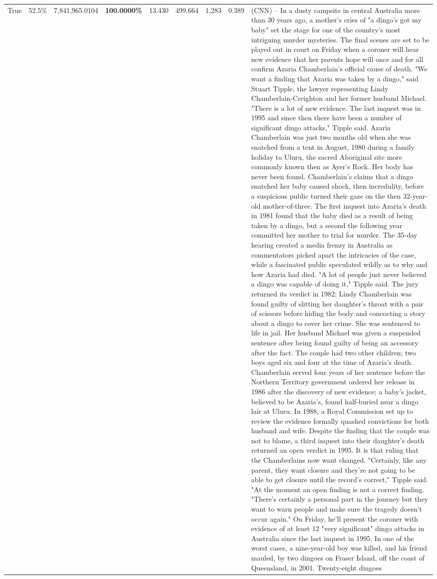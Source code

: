 \begin{table}[H]
\begin{tabular}{lllrlllll}
True & 52.5\% & 7,841,965.0104 & \bfseries \color{red} 100.0000\% & 13.430 & 499.664 & 1,283 & 0.389 & (CNN) -- In a dusty campsite in central Australia more than 30 years ago, a mother's cries of "a dingo's got my baby" set the stage for one of the country's most intriguing murder mysteries. The final scenes are set to be played out in court on Friday when a coroner will hear new evidence that her parents hope will once and for all confirm Azaria Chamberlain's official cause of death. "We want a finding that Azaria was taken by a dingo," said Stuart Tipple, the lawyer representing Lindy Chamberlain-Creighton and her former husband Michael. "There is a lot of new evidence. The last inquest was in 1995 and since then there have been a number of significant dingo attacks," Tipple said. Azaria Chamberlain was just two months old when she was snatched from a tent in August, 1980 during a family holiday to Uluru, the sacred Aboriginal site more commonly known then as Ayer's Rock. Her body has never been found. Chamberlain's claims that a dingo snatched her baby caused shock, then incredulity, before a suspicious public turned their gaze on the then 32-year-old mother-of-three. The first inquest into Azaria's death in 1981 found that the baby died as a result of being taken by a dingo, but a second the following year committed her mother to trial for murder. The 35-day hearing created a media frenzy in Australia as commentators picked apart the intricacies of the case, while a fascinated public speculated wildly as to why and how Azaria had died. "A lot of people just never believed a dingo was capable of doing it," Tipple said. The jury returned its verdict in 1982; Lindy Chamberlain was found guilty of slitting her daughter's throat with a pair of scissors before hiding the body and concocting a story about a dingo to cover her crime. She was sentenced to life in jail. Her husband Michael was given a suspended sentence after being found guilty of being an accessory after the fact. The couple had two other children; two boys aged six and four at the time of Azaria's death. Chamberlain served four years of her sentence before the Northern Territory government ordered her release in 1986 after the discovery of new evidence; a baby's jacket, believed to be Azaria's, found half-buried near a dingo lair at Uluru. In 1988, a Royal Commission set up to review the evidence formally quashed convictions for both husband and wife. Despite the finding that the couple was not to blame, a third inquest into their daughter's death returned an open verdict in 1995. It is that ruling that the Chamberlains now want changed. "Certainly, like any parent, they want closure and they're not going to be able to get closure until the record's correct," Tipple said. "At the moment an open finding is not a correct finding. "There's certainly a personal part in the journey but they want to warn people and make sure the tragedy doesn't occur again." On Friday, he'll present the coroner with evidence of at least 12 "very significant" dingo attacks in Australia since the last inquest in 1995. In one of the worst cases, a nine-year-old boy was killed, and his friend mauled, by two dingoes on Fraser Island, off the coast of Queensland, in 2001. Twenty-eight dingoes 
\end{tabular}
\end{table}
